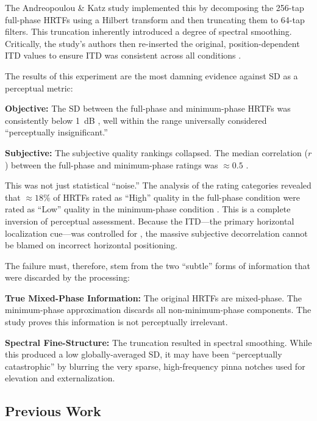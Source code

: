 \documentclass[12pt,a4paper]{article}
\begin{document}
The Andreopoulou \& Katz \cite{andreopoulou2022} study implemented this by decomposing the 256-tap full-phase HRTFs using a Hilbert transform and then truncating them to 64-tap filters. This truncation inherently introduced a degree of spectral smoothing. Critically, the study's authors then re-inserted the original, position-dependent ITD values to ensure ITD was consistent across all conditions \cite{andreopoulou2022}.

The results of this experiment are the most damning evidence against SD as a perceptual metric:

\textbf{Objective:} The SD between the full-phase and minimum-phase HRTFs was consistently below 1~dB \cite{andreopoulou2022}, well within the range universally considered ``perceptually insignificant.''

\textbf{Subjective:} The subjective quality rankings collapsed. The median correlation ($r$) between the full-phase and minimum-phase ratings was $\approx 0.5$ \cite{andreopoulou2022}.

This was not just statistical ``noise.'' The analysis of the rating categories revealed that $\approx 18\%$ of HRTFs rated as ``High'' quality in the full-phase condition were rated as ``Low'' quality in the minimum-phase condition \cite{andreopoulou2022}. This is a complete inversion of perceptual assessment. Because the ITD---the primary horizontal localization cue---was controlled for \cite{andreopoulou2022}, the massive subjective decorrelation cannot be blamed on incorrect horizontal positioning.

The failure must, therefore, stem from the two ``subtle'' forms of information that were discarded by the processing:

\textbf{True Mixed-Phase Information:} The original HRTFs are mixed-phase. The minimum-phase approximation discards all non-minimum-phase components. The study proves this information is not perceptually irrelevant.

\textbf{Spectral Fine-Structure:} The truncation resulted in spectral smoothing. While this produced a low globally-averaged SD, it may have been ``perceptually catastrophic'' by blurring the very sparse, high-frequency pinna notches used for elevation and externalization.



\subsection{Previous Work}
\end{document}
